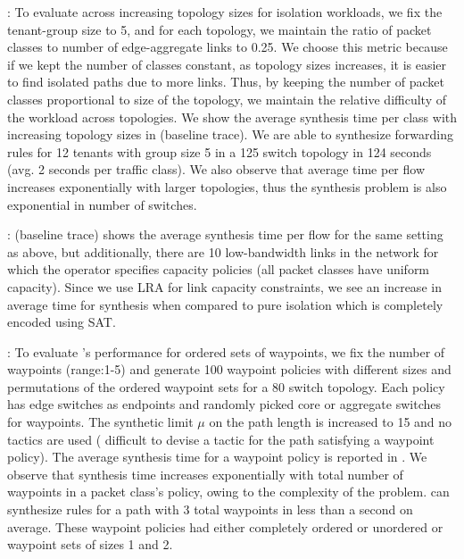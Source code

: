 : To evaluate \Name across
increasing topology sizes for isolation workloads, we fix the
tenant-group size to 5, and for each topology, we maintain the ratio
of packet classes to number of edge-aggregate links to 0.25.  We
choose this metric because if we kept the number of classes constant,
as topology sizes increases, it is easier to find isolated
paths due to more links. Thus, by keeping the number of packet classes proportional to
size of the topology, we maintain the relative difficulty of the
workload across topologies.  We show the average synthesis time per
class with increasing topology sizes in
 (baseline trace).  We are able to synthesize forwarding rules
for 12 tenants with group size 5 in a 125 switch topology in 124
seconds (avg. 2 seconds per traffic class).
We also observe that average time per flow increases exponentially
with larger topologies, thus the synthesis problem is also exponential
in number of switches.
  
  
 : 
  (baseline trace) 
 shows the average synthesis time per flow for the same setting as above, but
 additionally, there are 10 low-bandwidth links in the network for which the operator
 specifies capacity policies (all packet classes have uniform capacity). 
Since we use LRA for link capacity constraints, we see an 
increase in average time for synthesis 
when compared to pure isolation which is completely 
encoded using SAT. 

: To evaluate \Name's performance for
ordered sets of waypoints, we fix the number of waypoints (range:1-5)
and generate 100 waypoint policies with different sizes and permutations
of the ordered waypoint sets for a 80 switch topology. Each
policy has edge switches as endpoints and randomly picked core or
aggregate switches for waypoints. The synthetic limit $\mu$ on the
path length is increased to 15 and no tactics are used (
difficult to devise a tactic for the path satisfying a waypoint policy). The
average synthesis time for a waypoint policy is reported in
.  We observe that synthesis time increases
exponentially with total number of waypoints in a packet class's
policy, owing to the complexity of the problem.  \Name can synthesize
rules for a path with 3 total waypoints in less than a second on
average. These waypoint policies had either completely ordered or
unordered or waypoint sets of sizes 1 and 2.

